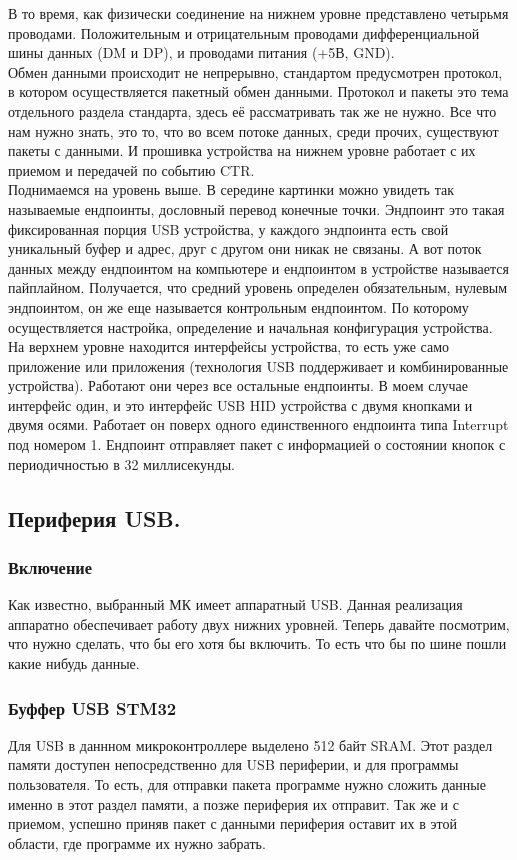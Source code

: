 \documentclass[12pt,a4paper]{article}
\begin{document}
    В то время, как физически соединение на нижнем уровне представлено
    четырьмя проводами. Положительным и отрицательным проводами дифференциальной
    шины данных (DM и DP), и проводами питания (+5В, GND). \\
    Обмен данными происходит не непрерывно, стандартом предусмотрен протокол, в
    котором осуществляется пакетный обмен данными. Протокол и пакеты это
    тема отдельного раздела стандарта, здесь её рассматривать так же не нужно.
    Все что нам нужно знать, это то, что во всем потоке данных, среди прочих,
     существуют пакеты с данными.
    И прошивка устройства на нижнем уровне работает с их приемом и передачей по
    событию CTR.\\
    Поднимаемся на уровень выше. В середине картинки можно увидеть так
    называемые ендпоинты, дословный перевод конечные точки. Эндпоинт это
    такая фиксированная порция USB устройства, у каждого эндпоинта есть свой
    уникальный буфер и адрес, друг с другом они никак не связаны. А вот поток
    данных между ендпоинтом на компьютере и ендпоинтом в устройстве называется
    пайплайном. Получается, что средний уровень определен обязательным, нулевым
    эндпоинтом, он же еще называется контрольным ендпоинтом. По которому
    осуществляется настройка, определение и начальная конфигурация устройства.\\
    На верхнем уровне находится интерфейсы устройства, то есть уже само
    приложение или приложения (технология USB поддерживает и комбинированные
    устройства). Работают они через все остальные ендпоинты. В моем случае интерфейс
    один, и это интерфейс USB HID
    устройства с двумя кнопками и двумя осями. Работает он поверх одного
    единственного ендпоинта типа Interrupt под номером 1.
    Ендпоинт отправляет пакет с информацией о состоянии кнопок
    с периодичностью в 32 миллисекунды.

\subsection{Периферия USB.}
\subsubsection{Включение}
    Как известно, выбранный МК имеет аппаратный USB. Данная реализация аппаратно
    обеспечивает работу двух нижних уровней. Теперь давайте посмотрим,
    что нужно сделать, что бы его хотя бы включить. То есть что бы по шине пошли
    какие нибудь данные.
\subsubsection{Буффер USB STM32}
    Для USB в даннном микроконтроллере выделено 512 байт SRAM. Этот раздел памяти
    доступен непосредственно для USB периферии, и для программы пользователя.
    То есть, для отправки пакета программе нужно сложить данные именно в этот
    раздел памяти, а позже периферия их отправит. Так же и с приемом, успешно
    приняв пакет с данными периферия оставит их в этой области, где программе
    их нужно забрать.
\end{document}

